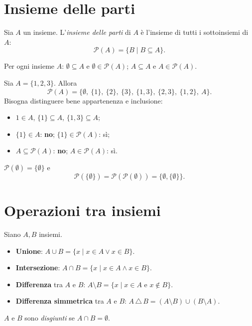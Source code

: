 \documentclass[11pt,a4paper]{article}
\begin{document}
\section{Insieme delle parti}

\begin{definizione}
Sia $A$ un insieme. L'\emph{insieme delle parti} di $A$ è l'insieme di
tutti i sottoinsiemi di $A$:
\[
\mathcal{P}(A) = \{B \mid B \subseteq A\}.
\]
\end{definizione}

\begin{osservazione}
Per ogni insieme $A$: $\emptyset \subseteq A$ e $\emptyset \in
\mathcal{P}(A)$; $A \subseteq A$ e $A \in \mathcal{P}(A)$.
\end{osservazione}

\begin{esempio}
Sia $A = \{1, 2, 3\}$. Allora
\[
\mathcal{P}(A) = \big\{\emptyset,\ \{1\},\ \{2\},\ \{3\},\
\{1,3\},\ \{2,3\},\ \{1,2\},\ A\big\}.
\]
Bisogna distinguere bene appartenenza e inclusione:
\begin{itemize}
    \item $1 \in A$, \quad $\{1\} \subseteq A$, \quad
          $\{1, 3\} \subseteq A$;
    \item $\{1\} \in A$: \textbf{no}; \quad $\{1\} \in \mathcal{P}(A)$:
          sì;
    \item $A \subseteq \mathcal{P}(A)$: \textbf{no}; \quad
          $A \in \mathcal{P}(A)$: sì.
\end{itemize}
\end{esempio}

\begin{esempio}
$\mathcal{P}(\emptyset) = \{\emptyset\}$ e
\[
\mathcal{P}(\{\emptyset\}) = \mathcal{P}(\mathcal{P}(\emptyset))
= \{\emptyset, \{\emptyset\}\}.
\]
\end{esempio}

\section{Operazioni tra insiemi}

Siano $A, B$ insiemi.

\begin{definizione}
\begin{itemize}
    \item \textbf{Unione}: $A \cup B = \{x \mid x \in A \lor x \in B\}$.
    \item \textbf{Intersezione}: $A \cap B = \{x \mid x \in A \land
          x \in B\}$.
    \item \textbf{Differenza} tra $A$ e $B$:
          $A \setminus B = \{x \mid x \in A \text{ e } x \notin B\}$.
    \item \textbf{Differenza simmetrica} tra $A$ e $B$:
          $A \,\triangle\, B = (A \setminus B) \cup (B \setminus A)$.
\end{itemize}
$A$ e $B$ sono \emph{disgiunti} se $A \cap B = \emptyset$.
\end{definizione}
\end{document}
